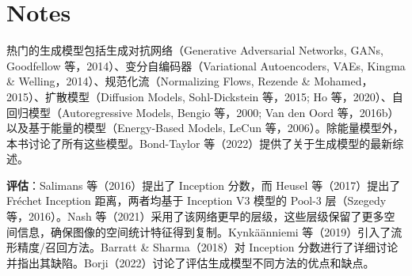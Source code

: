 \section{Notes}
热门的生成模型包括生成对抗网络（Generative Adversarial Networks, GANs, Goodfellow 等，2014）、变分自编码器（Variational Autoencoders, VAEs, Kingma \& Welling，2014）、规范化流（Normalizing Flows, Rezende \& Mohamed，2015）、扩散模型（Diffusion Models, Sohl-Dickstein 等，2015; Ho 等，2020）、自回归模型（Autoregressive Models, Bengio 等，2000; Van den Oord 等，2016b）以及基于能量的模型（Energy-Based Models, LeCun 等，2006）。除能量模型外，本书讨论了所有这些模型。Bond-Taylor 等（2022）提供了关于生成模型的最新综述。

\textbf{评估}：Salimans 等（2016）提出了 Inception 分数，而 Heusel 等（2017）提出了 Fréchet Inception 距离，两者均基于 Inception V3 模型的 Pool-3 层（Szegedy 等，2016）。Nash 等（2021）采用了该网络更早的层级，这些层级保留了更多空间信息，确保图像的空间统计特征得到复制。Kynkäänniemi 等（2019）引入了流形精度/召回方法。Barratt \& Sharma（2018）对 Inception 分数进行了详细讨论并指出其缺陷。Borji（2022）讨论了评估生成模型不同方法的优点和缺点。
